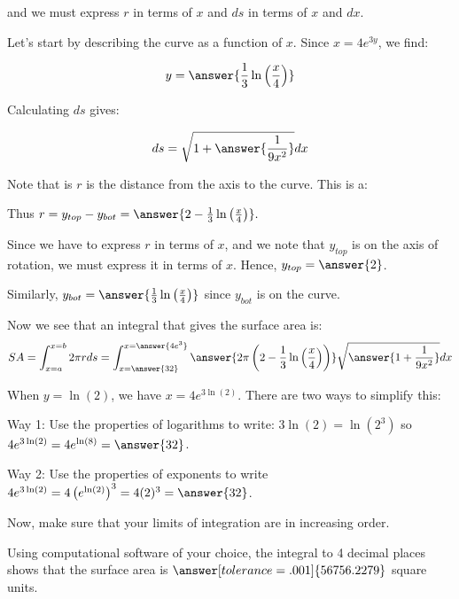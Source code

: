 \documentclass{ximera}
\begin{document}
\begin{exercise}
and we must express $r$ in terms of $x$ and $ds$ in terms of $x$ and $dx$.  


Let's start by describing the curve as a function of $x$.  Since $x=4e^{3y}$, we find:

\[
y= \answer{\frac{1}{3}\ln\left(\frac{x}{4}\right)}
\]

Calculating $ds$ gives: 

\[
ds = \sqrt{1+ \answer{\frac{1}{9x^2}}} dx
\]


\begin{exercise}
Note that is $r$ is the distance from the axis to the curve. This is a:

\begin{multipleChoice}
\end{multipleChoice} 
Thus $r=y_{top}-y_{bot} = \answer{2-\frac{1}{3}\ln\left(\frac{x}{4}\right)}.$


\begin{hint}
Since we have to express $r$ in terms of $x$, and we note that $y_{top}$ is on the axis of rotation, we must express it in terms of $x$.  Hence, $y_{top} = \answer{2}$.

Similarly, $y_{bot} =\answer{ \frac{1}{3}\ln\left(\frac{x}{4}\right)}$ since $y_{bot}$ is on the curve.
\end{hint}



\end{exercise}

\begin{exercise}
Now we see that an integral that gives the surface area is: 
\[
SA= \int_{x=a}^{x=b} 2 \pi r ds = \int_{x=\answer{32}}^{x=\answer{4e^3}} \answer{2 \pi \left(2-\frac{1}{3}\ln\left(\frac{x}{4}\right)\right)} \sqrt{\answer{1+\frac{1}{9x^2}}} dx
\]

\begin{hint}
When $y=\ln(2)$, we have $x= 4e^{3 \ln(2)}$.  There are two ways to simplify this:

Way 1: Use the properties of logarithms to write: $3 \ln(2) = \ln\left(2^3\right)$ so $4e^{3 \ln(2)} = 4e^{\ln(8)} =\answer{32}$.

Way 2: Use the properties of exponents to write $4e^{3 \ln(2)} = 4\left(e^{\ln(2)}\right)^3 = 4(2)^3 = \answer{32}$.

Now, make sure that your limits of integration are in increasing order.
\end{hint}

\begin{exercise}
Using computational software of your choice, the integral to 4 decimal places shows that the surface area is $\answer[tolerance=.001]{56756.2279}$ square units.  
\end{exercise}
\end{exercise}



\end{exercise}
\end{document}
